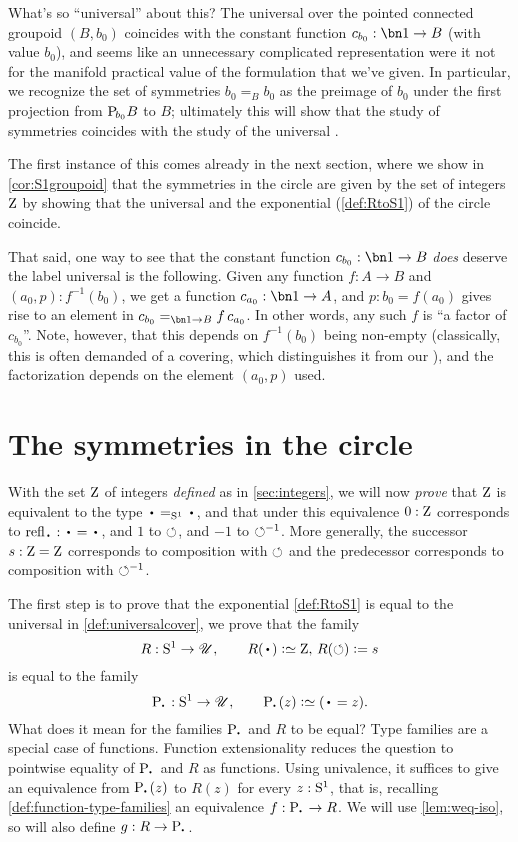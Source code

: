 \begin{remark}
  What's so ``universal'' about this?
The universal \covering over the pointed connected groupoid $(B,b_0)$ coincides with the constant function $c_{b_0}:\bn 1\to B$ (with value $b_0$), and seems like an unnecessary complicated representation were it not for the manifold practical value of the formulation that we've given.  
In particular, we recognize the set of symmetries $b_0=_Bb_0$ as the preimage of $b_0$ under the first projection from ${\mathrm{P}_{\!b_0}}B$ to $B$; ultimately this will show that the study of symmetries coincides with the study of the universal \covering.

The first instance of this comes already in the next section, where we show in \cref{cor:S1groupoid} that the symmetries in the circle are given by the set of integers $\mathrm{Z}$ by showing that the universal \covering and the exponential \covering (\cref{def:RtoS1}) of the circle coincide.

That said, one way to see that the constant function $c_{b_0}:\bn 1\to B$
\emph{does} deserve the label universal is the following. 
Given any function $f:A\to B$ and $(a_0,p): f^{-1}(b_0)$, 
we get a function $c_{a_0}:\bn 1\to A$, and $p:b_0=f(a_0)$ gives rise to
an element in $c_{b_0}=_{\bn 1\to B}f\, c_{a_0}$.  
In other words, any such $f$ is ``a factor of $c_{b_0}$''.  
Note, however, that this depends on $f^{-1}(b_0)$ being non-empty
(classically, this is often demanded of a covering, which distinguishes it from our \coverings), 
and the factorization depends on the element $(a_0,p)$ used. 
\end{remark}



\section{The symmetries in the circle}
\label{sec:symcirc}

With the set $\mathrm{Z}$ of integers \emph{defined} as in \cref{sec:integers}, 
we will now \emph{prove} that $\mathrm{Z}$ is equivalent to the type 
$\base=_{\Sc}\base$, and that under this equivalence $0:\mathrm{Z}$ corresponds to 
$\refl{\base}:\base=\base$, and $1$ to $\circlearrowleft$, and $-1$ to $\circlearrowleft^{-1}$. 
More generally, the successor ${s}:\mathrm{Z}=\mathrm{Z}$ corresponds to composition with $\circlearrowleft$
and the predecessor corresponds to composition with $\circlearrowleft^{-1}$.

The first step is to prove that the exponential \covering \cref{def:RtoS1} 
is equal to the universal \covering in \cref{def:universalcover},
\ie we prove that the family 
\[
R: \Sc\to\UU,\qquad R(\base)\defeq\zet,\, R(\Sloop)\defis \etop{s}
\]
is equal to the family
\[
\uc{\base}:\Sc\to\UU,\qquad \uc{\base}(z)\defeq (\base=z).
\]
What does it mean for the families $\uc{\base}$ and $R$ to be equal?
Type families are a special case of functions. 
Function extensionality reduces the question to pointwise equality
of $\uc{\base}$ and $R$ as functions.
Using univalence, it suffices to give
an equivalence from $\uc{\base}(z)$ to $R(z)$ for every $z:{\mathrm{S}^1}$,
that is, recalling \cref{def:function-type-families}
an equivalence $f: \uc{\base}\to R$. We will use
\cref{lem:weq-iso}, so will also define $g: R\to\uc{\base}$.


